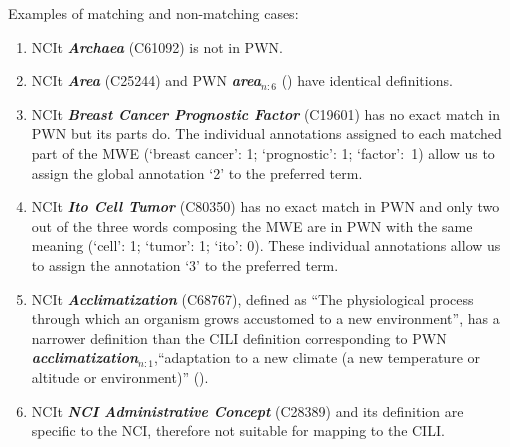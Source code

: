 \documentclass[11pt]{article}
\newcommand{\lex}[1]{\textbf{\textit{#1}}}
\begin{document}
Examples of matching and non-matching cases:
\begin{enumerate}[start=0]
\item NCIt \lex{Archaea} (C61092) is not in PWN.
\item NCIt \lex{Area} (C25244) and PWN \lex{area}$_{n:6}$ () have identical definitions.
\item NCIt \lex{Breast Cancer Prognostic Factor} (C19601) has no exact match in PWN but its parts do. The individual annotations assigned to each matched part of the MWE (`breast cancer': 1; `prognostic': 1; `factor':~1) allow us to assign the global annotation `2' to the preferred term.
\item NCIt \lex{Ito Cell Tumor} (C80350) has no exact match in PWN and only two out of the three words composing the MWE are in PWN with the same meaning (`cell': 1; `tumor': 1; `ito': 0). These individual annotations allow us to assign the annotation `3' to the preferred term.
\item NCIt \lex{Acclimatization} (C68767), defined as ``The physiological process through which an organism grows accustomed to a new environment'', has a narrower definition than the CILI definition corresponding to PWN \lex{acclimatization}$_{n:1}$,``adaptation to a new climate (a new temperature or altitude or environment)'' ().
\item NCIt \lex{NCI Administrative Concept} (C28389) and its definition %
are specific to the NCI, therefore not suitable for mapping to the CILI.
\end{enumerate}
\end{document}

